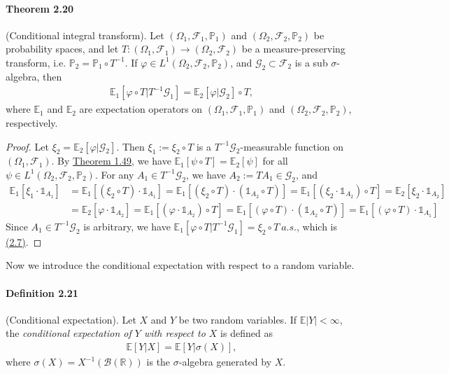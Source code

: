 \documentclass{article}
\numberwithin{equation}{section}
\newcommand{\E}{\mathbb{E}}
\renewcommand{\P}{\mathbb{P}}
\theoremstyle{plain}
\theoremstyle{definition}
\begin{document}
\paragraph{Theorem 2.20\label{thm:2.20}} (Conditional integral transform). Let $(\Omega_1,\mathscr{F}_1,\P_1)$ and $(\Omega_2,\mathscr{F}_2,\P_2)$ be probability spaces, and let $T:(\Omega_1,\mathscr{F}_1)\to(\Omega_2,\mathscr{F}_2)$ be a measure-preserving transform, i.e. $\P_2=\P_1\circ T^{-1}$. If $\varphi\in L^1(\Omega_2,\mathscr{F}_2,\P_2)$, and $\mathscr{G}_2\subset\mathscr{F}_2$ is a sub $\sigma$-algebra, then
\begin{align*}
	\E_1[\varphi\circ T|T^{-1}\mathscr{G}_1]=\E_2[\varphi|\mathscr{G}_2]\circ T,\tag{2.7}\label{eq:2.7}
\end{align*}
where $\E_1$ and $\E_2$ are expectation operators on $(\Omega_1,\mathscr{F}_1,\P_1)$ and $(\Omega_2,\mathscr{F}_2,\P_2)$, respectively.
\begin{proof}
Let $\xi_2=\E_2[\varphi|\mathscr{G}_2]$. Then $\xi_1:=\xi_2\circ T$ is a $T^{-1}\mathscr{G}_2$-measurable function on $(\Omega_1,\mathscr{F}_1)$. By \hyperref[thm:1.49]{Theorem 1.49}, we have $\E_1[\psi\circ T]=\E_2[\psi]$ for all $\psi\in L^1(\Omega_2,\mathscr{F}_2,\P_2)$. For any $A_1\in T^{-1}\mathscr{G}_2$, we have $A_2:=TA_1\in\mathscr{G}_2$, and
\begin{align*}
	\E_1[\xi_1\cdot\mathds{1}_{A_1}] &= \E_1[(\xi_2\circ T)\cdot\mathds{1}_{A_1}] = \E_1[(\xi_2\circ T)\cdot(\mathds{1}_{A_2}\circ T)] = \E_1[(\xi_2\cdot\mathds{1}_{A_2})\circ T] =\E_2[\xi_2\cdot\mathds{1}_{A_2}]\\
	&= \E_2[\varphi\cdot\mathds{1}_{A_2}]
	=\E_1[(\varphi\cdot\mathds{1}_{A_2})\circ T] = \E_1[(\varphi\circ T)\cdot(\mathds{1}_{A_2}\circ T)] = \E_1[(\varphi\circ T)\cdot\mathds{1}_{A_1}]
\end{align*}
Since $A_1\in T^{-1}\mathscr{G}_2$ is arbitrary, we have $\E_1[\varphi\circ T|T^{-1}\mathscr{G}_1]=\xi_2\circ T\ a.s.$, which is \hyperref[eq:2.7]{(2.7)}.
\end{proof}

Now we introduce the conditional expectation with respect to a random variable.

\paragraph{Definition 2.21\label{def:2.21}} (Conditional expectation). Let $X$ and $Y$ be two random variables. If $\E\vert Y\vert <\infty$, the \textit{conditional expectation of $Y$ with respect to $X$} is defined as
\begin{align*}
	\E[Y|X]=\E[Y|\sigma(X)],
\end{align*}
where $\sigma(X)=X^{-1}(\mathscr{B}(\mathbb{R}))$ is the $\sigma$-algebra generated by $X$.
\end{document}
